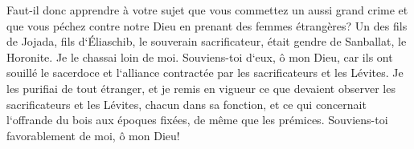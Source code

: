 \verse Faut-il donc apprendre à votre sujet que vous commettez un aussi grand crime et que vous péchez contre notre Dieu en prenant des femmes étrangères? 
\verse Un des fils de Jojada, fils d`Éliaschib, le souverain sacrificateur, était gendre de Sanballat, le Horonite. Je le chassai loin de moi. 
\verse Souviens-toi d`eux, ô mon Dieu, car ils ont souillé le sacerdoce et l`alliance contractée par les sacrificateurs et les Lévites. 
\verse Je les purifiai de tout étranger, et je remis en vigueur ce que devaient observer les sacrificateurs et les Lévites, chacun dans sa fonction, 
\verse et ce qui concernait l`offrande du bois aux époques fixées, de même que les prémices. Souviens-toi favorablement de moi, ô mon Dieu! 
